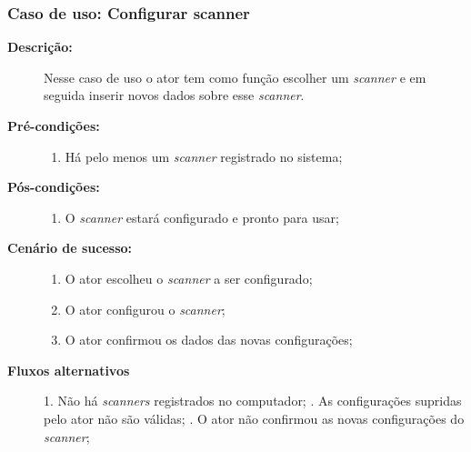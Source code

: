\subsubsection{Caso de uso: Configurar scanner}
\begin{description}
    \item[{\bf Descrição:}] Nesse caso de uso o ator tem como função escolher um {\it scanner} e em seguida inserir novos dados sobre esse {\it scanner}.
    \item[{\bf Pré-condições:}]
        \begin{enumerate}
            \item Há pelo menos um {\it scanner} registrado no sistema;
        \end{enumerate}
    \item[{\bf Pós-condições:}] 
        \begin{enumerate}
            \item O {\it scanner} estará configurado e pronto para usar;
        \end{enumerate}
    
    \item[{\bf Cenário de sucesso:}]
        \begin{enumerate}
            \item O ator escolheu o  {\it scanner} a ser configurado;
            \item O ator configurou o {\it scanner};
            \item O ator confirmou os dados das novas configurações;
        \end{enumerate}

    \item[{\bf Fluxos alternativos}]
        1. Não há {\it scanners} registrados no computador; . As configurações supridas pelo ator não são válidas; . O ator não confirmou as novas configurações do {\it scanner};
\end{description}


